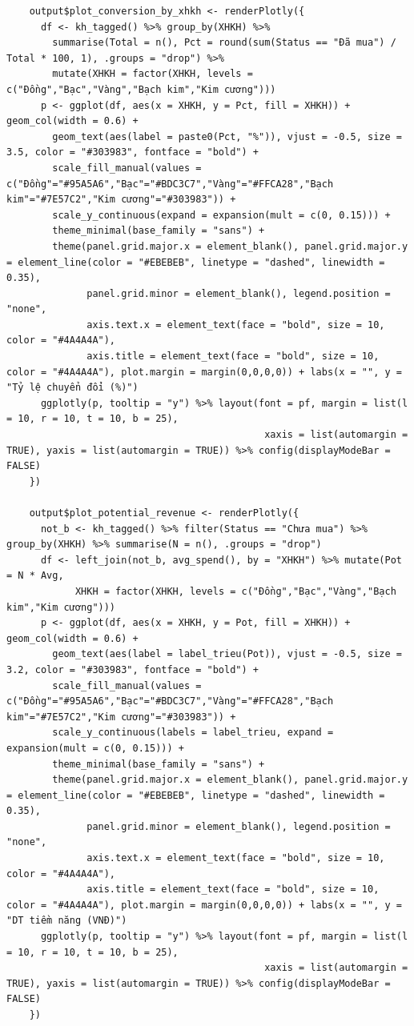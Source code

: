\documentclass[12pt, a4paper]{article}
\begin{document}
\begin{lstlisting}
    output$plot_conversion_by_xhkh <- renderPlotly({
      df <- kh_tagged() %>% group_by(XHKH) %>%
        summarise(Total = n(), Pct = round(sum(Status == "Đã mua") / Total * 100, 1), .groups = "drop") %>%
        mutate(XHKH = factor(XHKH, levels = c("Đồng","Bạc","Vàng","Bạch kim","Kim cương")))
      p <- ggplot(df, aes(x = XHKH, y = Pct, fill = XHKH)) + geom_col(width = 0.6) +
        geom_text(aes(label = paste0(Pct, "%")), vjust = -0.5, size = 3.5, color = "#303983", fontface = "bold") +
        scale_fill_manual(values = c("Đồng"="#95A5A6","Bạc"="#BDC3C7","Vàng"="#FFCA28","Bạch kim"="#7E57C2","Kim cương"="#303983")) +
        scale_y_continuous(expand = expansion(mult = c(0, 0.15))) +
        theme_minimal(base_family = "sans") +
        theme(panel.grid.major.x = element_blank(), panel.grid.major.y = element_line(color = "#EBEBEB", linetype = "dashed", linewidth = 0.35),
              panel.grid.minor = element_blank(), legend.position = "none",
              axis.text.x = element_text(face = "bold", size = 10, color = "#4A4A4A"),
              axis.title = element_text(face = "bold", size = 10, color = "#4A4A4A"), plot.margin = margin(0,0,0,0)) + labs(x = "", y = "Tỷ lệ chuyển đổi (%)")
      ggplotly(p, tooltip = "y") %>% layout(font = pf, margin = list(l = 10, r = 10, t = 10, b = 25),
                                             xaxis = list(automargin = TRUE), yaxis = list(automargin = TRUE)) %>% config(displayModeBar = FALSE)
    })

    output$plot_potential_revenue <- renderPlotly({
      not_b <- kh_tagged() %>% filter(Status == "Chưa mua") %>% group_by(XHKH) %>% summarise(N = n(), .groups = "drop")
      df <- left_join(not_b, avg_spend(), by = "XHKH") %>% mutate(Pot = N * Avg,
            XHKH = factor(XHKH, levels = c("Đồng","Bạc","Vàng","Bạch kim","Kim cương")))
      p <- ggplot(df, aes(x = XHKH, y = Pot, fill = XHKH)) + geom_col(width = 0.6) +
        geom_text(aes(label = label_trieu(Pot)), vjust = -0.5, size = 3.2, color = "#303983", fontface = "bold") +
        scale_fill_manual(values = c("Đồng"="#95A5A6","Bạc"="#BDC3C7","Vàng"="#FFCA28","Bạch kim"="#7E57C2","Kim cương"="#303983")) +
        scale_y_continuous(labels = label_trieu, expand = expansion(mult = c(0, 0.15))) +
        theme_minimal(base_family = "sans") +
        theme(panel.grid.major.x = element_blank(), panel.grid.major.y = element_line(color = "#EBEBEB", linetype = "dashed", linewidth = 0.35),
              panel.grid.minor = element_blank(), legend.position = "none",
              axis.text.x = element_text(face = "bold", size = 10, color = "#4A4A4A"),
              axis.title = element_text(face = "bold", size = 10, color = "#4A4A4A"), plot.margin = margin(0,0,0,0)) + labs(x = "", y = "DT tiềm năng (VNĐ)")
      ggplotly(p, tooltip = "y") %>% layout(font = pf, margin = list(l = 10, r = 10, t = 10, b = 25),
                                             xaxis = list(automargin = TRUE), yaxis = list(automargin = TRUE)) %>% config(displayModeBar = FALSE)
    })


\end{lstlisting}
\end{document}

